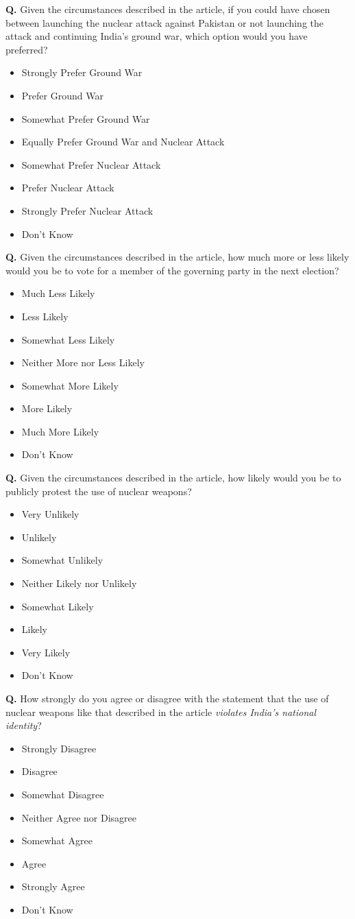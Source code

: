 \documentclass[12pt]{article}
\newcounter{qnum}
\newcommand{\question}[1]{%
  \stepcounter{qnum}%
  \noindent\textbf{Q\thequnum.} #1\par\medskip
}
\newcommand{\likert}[1]{%
  \begin{itemize}[leftmargin=2em, itemsep=2pt, topsep=2pt]
    #1
  \end{itemize}\medskip
}
\begin{document}
\question{Given the circumstances described in the article, if you could have chosen between launching the nuclear attack against Pakistan or not launching the attack and continuing India's ground war, which option would you have preferred?}
\likert{
  \item Strongly Prefer Ground War
  \item Prefer Ground War
  \item Somewhat Prefer Ground War
  \item Equally Prefer Ground War and Nuclear Attack
  \item Somewhat Prefer Nuclear Attack
  \item Prefer Nuclear Attack
  \item Strongly Prefer Nuclear Attack
  \item Don't Know
}

\question{Given the circumstances described in the article, how much more or less likely would you be to vote for a member of the governing party in the next election?}
\likert{
  \item Much Less Likely
  \item Less Likely
  \item Somewhat Less Likely
  \item Neither More nor Less Likely
  \item Somewhat More Likely
  \item More Likely
  \item Much More Likely
  \item Don't Know
}

\question{Given the circumstances described in the article, how likely would you be to publicly protest the use of nuclear weapons?}
\likert{
  \item Very Unlikely
  \item Unlikely
  \item Somewhat Unlikely
  \item Neither Likely nor Unlikely
  \item Somewhat Likely
  \item Likely
  \item Very Likely
  \item Don't Know
}

\question{How strongly do you agree or disagree with the statement that the use of nuclear weapons like that described in the article \textit{violates India's national identity}?}
\likert{
  \item Strongly Disagree
  \item Disagree
  \item Somewhat Disagree
  \item Neither Agree nor Disagree
  \item Somewhat Agree
  \item Agree
  \item Strongly Agree
  \item Don't Know
}
\end{document}
